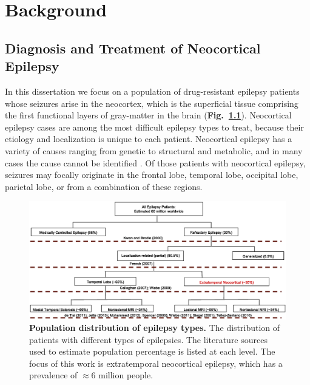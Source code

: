 \chapter{Background}
\label{ch:background}

\ifpdf
    \graphicspath{{chapters/ch2_figures/PNG/}{chapters/ch2_figures/PDF/}{chapters/ch2_figures/}}
\else
    \graphicspath{{chapters/ch2_figures/EPS/}{chapters/ch2_figures/}}
\fi



\section{Diagnosis and Treatment of Neocortical Epilepsy}
In this dissertation we focus on a population of drug-resistant epilepsy patients whose seizures arise in the neocortex, which is the superficial tissue comprising the first functional layers of gray-matter in the brain (\textbf{Fig.~\ref{epilepsy_type}}). Neocortical epilepsy cases are among the most difficult epilepsy types to treat, because their etiology and localization is unique to each patient. Neocortical epilepsy has a variety of causes ranging from genetic to structural and metabolic, and in many cases the cause cannot be identified \cite{berg2010revised}. Of those patients with neocortical epilepsy, seizures may focally originate in the frontal lobe, temporal lobe, occipital lobe, parietal lobe, or from a combination of these regions.

\begin{figure}[H]
\centering
\includegraphics[width=\textwidth]{epilepsy_type}
\caption[Chart of epilepsy types]{\textbf{Population distribution of epilepsy types.} The distribution of patients with different types of epilepsies. The literature sources used to estimate population percentage is listed at each level. The focus of this work is extratemporal neocortical epilepsy, which has a prevalence of $\approx$6 million people.}
\label{epilepsy_type}
\end{figure}

